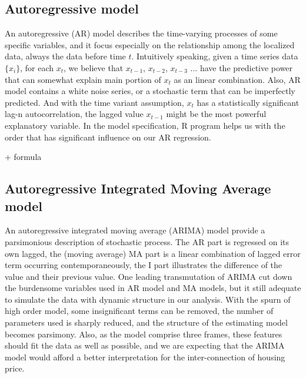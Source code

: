 \documentclass[12pt,letterpaper]{article}
\begin{document}
\subsection{Autoregressive model}
An autoregressive (AR) model describes the time-varying processes of some specific variables, and it focus especially on the relationship among the localized data, always the data before time $t$. 
Intuitively speaking, given a time series data $ \{x_i\}$, for each $x_t$, we believe that $x_{t-1}$, $x_{t-2}$, $x_{t-3}$ $\dots$ have the predictive power that can somewhat explain main portion of $x_t$ as an linear combination.
Also, AR model contains a white noise series, or a stochastic term that can be imperfectly predicted.
And with the time variant assumption, $x_t$ has a statistically significant lag-n autocorrelation, the lagged value $x_{t-1}$ might be the most powerful explanatory variable.
In the model specification, R program helps us with the order that has significant influence on our AR regression.

+ formula 

\subsection{Autoregressive Integrated Moving Average model}
An autoregressive integrated moving average (ARIMA) model provide a parsimonious description of stochastic process. 
The AR part is regressed on its own lagged, the (moving average) MA part is a linear combination of lagged error term occurring contemporaneously, the I part illustrates the difference of the value and their previous value. 
One leading transmutation of ARIMA cut down the burdensome variables used in AR model and MA models, but it still adequate to simulate the data with dynamic structure in our analysis.
With the spurn of high order model, some insignificant terms can be removed, the number of parameters used is sharply reduced, and the structure of the estimating model becomes parsimony.
Also, as the model comprise three frames, these features should fit the data as well as possible, and we are expecting that the ARIMA model would afford a better interpretation for the inter-connection of housing price.
\end{document}
